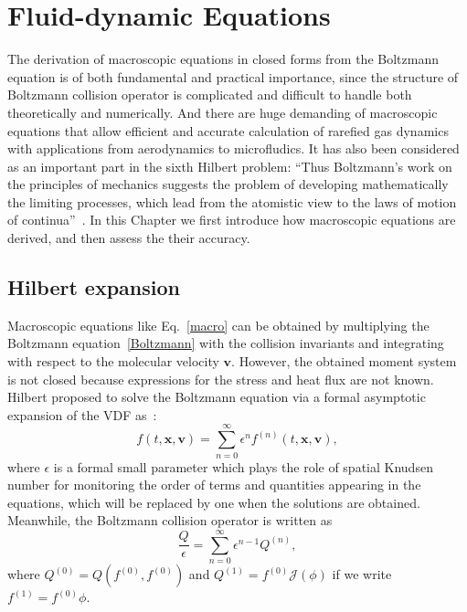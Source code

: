 
\chapter{Fluid-dynamic Equations}
\label{chap:macroscopic}


The derivation of macroscopic equations in closed forms from the Boltzmann equation is of both fundamental and practical importance, since the structure of Boltzmann collision operator is complicated and difficult to handle both theoretically and numerically. And there are huge demanding of macroscopic equations that allow efficient and accurate calculation of rarefied gas dynamics with applications from aerodynamics to microfludics. It has also been considered as an important part in the sixth Hilbert problem: ``Thus Boltzmann's work on the principles of mechanics suggests the problem of developing mathematically the limiting processes, which lead from the atomistic view to the laws of motion of continua''~\cite{Hilbert1902}. In this Chapter we first introduce how macroscopic equations are derived, and then assess the their accuracy. %


\section{Hilbert expansion}

Macroscopic equations like Eq.~\eqref{macro} can be obtained by multiplying the Boltzmann equation~\eqref{Boltzmann} with the collision invariants and integrating with respect to the molecular velocity $\bm{v}$. However, the obtained moment system is not closed because expressions for the stress and heat flux are not known. Hilbert proposed to solve the Boltzmann equation via a formal asymptotic expansion of the VDF as~\cite{Hilbert1912}:
\begin{equation}\label{asymptotic}
f(t,\bm{x},\bm{v})=\sum_{n=0}^\infty {\epsilon^n} f^{(n)}(t,\bm{x},\bm{v}),
\end{equation}
where $\epsilon$ is a formal small parameter which plays the role of spatial Knudsen number for monitoring the order of terms and quantities appearing in the equations, which will be replaced by one when the solutions are obtained. Meanwhile, the Boltzmann collision operator is written as
\begin{equation}
\frac{Q}{\epsilon}=\sum_{n=0}^\infty {\epsilon^{n-1}} Q^{(n)}, 
\end{equation} 
where $Q^{(0)}=Q(f^{(0)},f^{(0)})$ and $Q^{(1)}=f^{(0)}\mathcal{J}(\phi)$ if we write $f^{(1)}=f^{(0)}\phi$.

